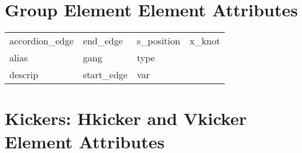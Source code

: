  \section{Group Element Element Attributes}
 \label{s:list.group}
 
 \begin{tabular}{llll} \toprule
accordion_edge              & end_edge                    & s_position                  & x_knot                      \\
alias                       & gang                        & type                        &                             \\
descrip                     & start_edge                  & var                         &                             \\
 \bottomrule
 \end{tabular}
 \vfill
 
 \section{Kickers: Hkicker and Vkicker Element Attributes}
 \label{s:list.hvkicker}
 
